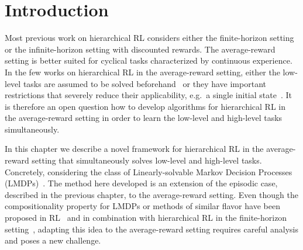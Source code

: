 \section{Introduction}

Most previous work on hierarchical RL considers either the finite-horizon setting or the infinite-horizon setting with discounted rewards.
The average-reward setting is better suited for cyclical tasks characterized by continuous experience.
In the few works on hierarchical RL in the average-reward setting, either the low-level tasks are assumed to be solved beforehand~\citep{Fruit2017,Fruit2017b,Wan2021a} or they %
have important restrictions that severely reduce their applicability, e.g.~a single initial state~\citep{Ghavamzadeh2007}. It is therefore an open question how to develop algorithms for hierarchical RL in the average-reward setting
in order to learn the low-level and high-level tasks simultaneously.


In this chapter we describe a novel framework for hierarchical RL in the average-reward setting that simultaneously solves low-level and high-level tasks. Concretely, considering the class of Linearly-solvable Markov Decision Processes (LMDPs)~\citep{Todorov2006}. The method here developed is an extension of the episodic case, described in the previous chapter, to the average-reward setting. Even though the compositionality property for LMDPs or methods of similar flavor have been proposed in RL~\cite{Hunt2019,Niekerk2019,NangueTasse2020} and in combination with hierarchical RL in the finite-horizon setting~\cite{Jonsson2016,Saxe2017,Infante2022}, adapting this idea to the average-reward setting requires careful analysis and poses a new challenge.





